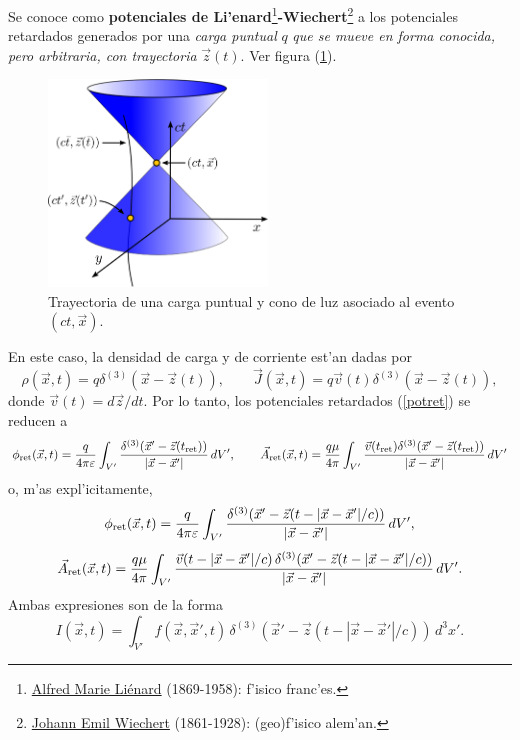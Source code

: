 Se conoce como \textbf{potenciales de Li'enard}\footnote{\href{https://en.wikipedia.org/wiki/Alfred-Marie_Li\%C3\%A9nard}{Alfred Marie Li\'enard} (1869-1958): f'isico franc'es.}\textbf{-Wiechert}\footnote{\href{https://en.wikipedia.org/wiki/Emil_Wiechert}{Johann Emil Wiechert} (1861-1928): (geo)f'isico alem'an.} a los potenciales retardados generados por una \textit{carga puntual} $q$ \textit{que se mueve en forma conocida, pero arbitraria, con trayectoria} $\vec{z}(t)$. Ver figura (\ref{fig:LW}).
\begin{figure}[ht]
\centerline{\includegraphics[height=5.5cm]{fig/fig-cono-de-luz-02.pdf}}
\caption{Trayectoria de una carga puntual y cono de luz asociado al evento $(ct,\vec{x})$.}
\label{fig:LW}
\end{figure}
En este caso, la densidad de carga y de corriente est'an dadas por
\begin{equation}
\rho(\vec{x},t)=q\delta^{(3)}(\vec{x}-\vec{z}(t)), \qquad
\vec{J}(\vec{x},t)=q\vec{v}(t)\delta^{(3)}(\vec{x}-\vec{z}(t)),
\end{equation}
donde $\vec{v}(t)={d\vec{z}}/{dt}$. Por lo tanto, los potenciales retardados (\ref{potret}) se reducen a
\begin{equation}
\phi_{\rm ret}(\vec{x},t)=\frac{q}{4\pi\varepsilon}\int_{V'}
\frac{\delta^{(3)}(\vec{x}'-\vec{z}(t_{\rm ret}))}{|\vec{x}-\vec{x}'|}\,dV', \qquad
\vec{A}_{\rm ret}(\vec{x},t)=\frac{q\mu}{4\pi}\int_{V'}
\frac{\vec{v}(t_{\rm ret})\delta^{(3)}(\vec{x}'-\vec{z}(t_{\rm ret}))}{|\vec{x}-\vec{x}'|}\,dV'  \label{potretq1}
\end{equation}
o, m'as expl'icitamente,
\begin{equation}
\phi_{\rm ret}(\vec{x},t)=\frac{q}{4\pi\varepsilon}\int_{V'}
\frac{\delta^{(3)}(\vec{x}'-\vec{z}(t-|\vec{x}-\vec{x}'|/c))}{|\vec{x}-\vec{x}'|}\,dV', \end{equation}
\begin{equation}
\vec{A}_{\rm ret}(\vec{x},t)=\frac{q\mu}{4\pi}\int_{V'}
\frac{\vec{v}(t-|\vec{x}-\vec{x}'|/c)\,\delta^{(3)}(\vec{x}'-\vec{z}(t-|\vec{x}-\vec{x}'|/c))}{|\vec{x}-\vec{x}'|}\,dV' . \label{potretq2}
\end{equation}
Ambas expresiones son de la forma
\begin{equation}
I(\vec{x},t)=\int_{V'}
f(\vec{x},\vec{x}',t)\,\delta^{(3)}(\vec{x}'-\vec{z}(t-|\vec{x}-\vec{x}'|/c))\,d^3x' . \label{potretqg1}
\end{equation}

